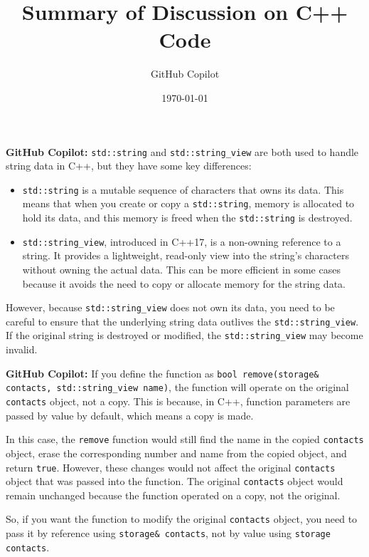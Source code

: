 \textbf{GitHub Copilot:} \texttt{std::string} and \texttt{std::string\_view} are both used to handle string data in C++, but they have some key differences:

\begin{itemize}
    \item \texttt{std::string} is a mutable sequence of characters that owns its data. This means that when you create or copy a \texttt{std::string}, memory is allocated to hold its data, and this memory is freed when the \texttt{std::string} is destroyed.
    \item \texttt{std::string\_view}, introduced in C++17, is a non-owning reference to a string. It provides a lightweight, read-only view into the string's characters without owning the actual data. This can be more efficient in some cases because it avoids the need to copy or allocate memory for the string data.
\end{itemize}

However, because \texttt{std::string\_view} does not own its data, you need to be careful to ensure that the underlying string data outlives the \texttt{std::string\_view}. If the original string is destroyed or modified, the \texttt{std::string\_view} may become invalid.

\textbf{GitHub Copilot:} If you define the function as \texttt{bool remove(storage\& contacts, std::string\_view name)}, the function will operate on the original \texttt{contacts} object, not a copy. This is because, in C++, function parameters are passed by value by default, which means a copy is made.

In this case, the \texttt{remove} function would still find the name in the copied \texttt{contacts} object, erase the corresponding number and name from the copied object, and return \texttt{true}. However, these changes would not affect the original \texttt{contacts} object that was passed into the function. The original \texttt{contacts} object would remain unchanged because the function operated on a copy, not the original.

So, if you want the function to modify the original \texttt{contacts} object, you need to pass it by reference using \texttt{storage\& contacts}, not by value using \texttt{storage contacts}.

\documentclass{article}
\usepackage{listings}



\title{Summary of Discussion on C++ Code}
\author{GitHub Copilot}
\date{\today}

